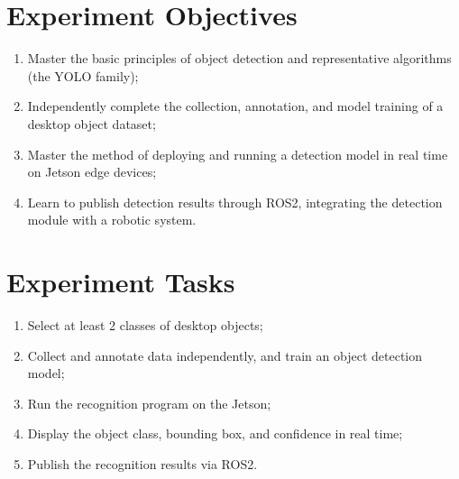 \documentclass[12pt, a4paper]{article}
\begin{document}
\section{Experiment Objectives}
\begin{enumerate}[label=\arabic*., leftmargin=2em]
    \item Master the basic principles of object detection and representative algorithms (the YOLO family);
    \item Independently complete the collection, annotation, and model training of a desktop object dataset;
    \item Master the method of deploying and running a detection model in real time on Jetson edge devices;
    \item Learn to publish detection results through ROS2, integrating the detection module with a robotic system.
\end{enumerate}

\section{Experiment Tasks}
\begin{enumerate}[label=\arabic*., leftmargin=2em]
    \item Select at least 2 classes of desktop objects;
    \item Collect and annotate data independently, and train an object detection model;
    \item Run the recognition program on the Jetson;
    \item Display the object class, bounding box, and confidence in real time;
    \item Publish the recognition results via ROS2.
\end{enumerate}

\end{document}
